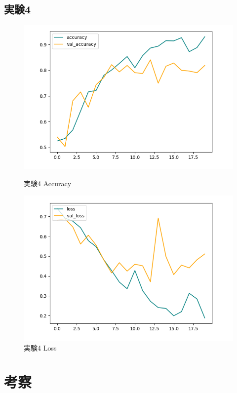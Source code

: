 \documentclass[a4paper, 11pt, titlepage]{jsarticle}
\begin{document}
\subsection{実験4}
\begin{figure}[htbp]
  \begin{minipage}[b]{0.45\linewidth}
    \centering
    \includegraphics[keepaspectratio, scale=0.435]{ex4_acc.png}
    \caption{実験4 Accuracy}
  \end{minipage}
  \begin{minipage}[b]{0.45\linewidth}
    \centering
    \includegraphics[keepaspectratio, scale=0.435]{ex4_loss.png}
    \caption{実験4 Loss}
  \end{minipage}
\end{figure}

\section{考察}
\end{document}
